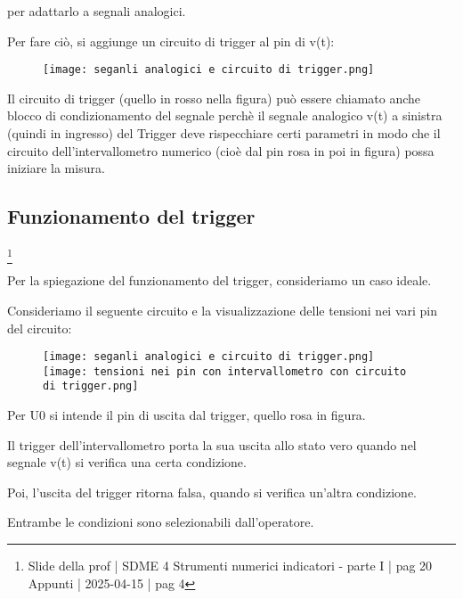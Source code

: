 per adattarlo a segnali analogici. \newline 

Per fare ciò, si aggiunge un circuito di trigger al pin di v(t):

\begin{figure}[h]
    \centering
    \texttt{[image: seganli analogici e circuito di trigger.png]}
\end{figure} 

Il circuito di trigger (quello in rosso nella figura) può essere chiamato anche blocco di condizionamento del segnale 
perchè il segnale analogico v(t) a sinistra (quindi in ingresso) del Trigger deve rispecchiare certi parametri in modo che 
il circuito dell'intervallometro numerico (cioè dal pin rosa in poi in figura) possa iniziare la misura. \newline 

\newpage 

\subsection{Funzionamento del trigger}
\footnote{Slide della prof | SDME 4 Strumenti numerici indicatori - parte I | pag 20 \\  
Appunti | 2025-04-15 | pag 4}

Per la spiegazione del funzionamento del trigger, consideriamo un caso ideale. \newline 

Consideriamo il seguente circuito e la visualizzazione delle tensioni nei vari pin del circuito: 

\begin{figure}[h]
    \centering
    \texttt{[image: seganli analogici e circuito di trigger.png]}
    \texttt{[image: tensioni nei pin con intervallometro con circuito di trigger.png]}
\end{figure} 

Per U0 si intende il pin di uscita dal trigger, quello rosa in figura. \newline 

Il trigger dell'intervallometro porta la sua uscita allo stato vero quando nel segnale v(t) si verifica una certa condizione. \newline 

Poi, l'uscita del trigger ritorna falsa, quando si verifica un'altra condizione. \newline 

Entrambe le condizioni sono selezionabili dall'operatore. \newline 

